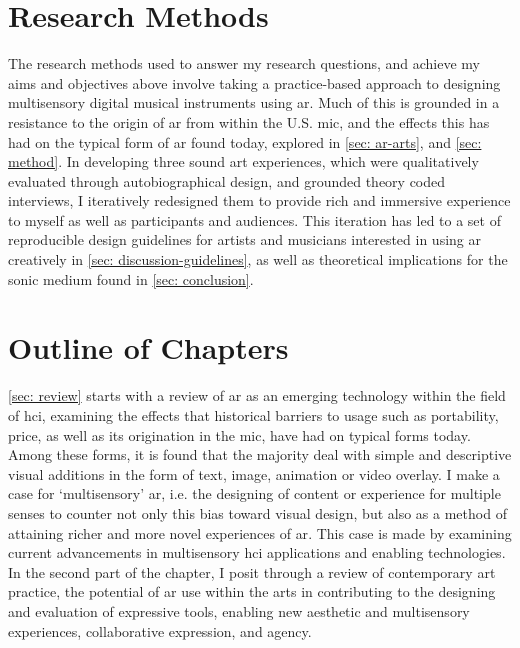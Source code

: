 \section{Research Methods}\label{sec: introduction-methods}
The research methods used to answer my research questions, and achieve my aims and objectives above involve taking a practice-based approach to designing multisensory digital musical instruments using \gls{ar}. Much of this is grounded in a resistance to the origin of \gls{ar} from within the U.S. \gls{mic}, and the effects this has had on the typical form of \gls{ar} found today, explored in \autoref{sec: ar-arts}, and \autoref{sec: method}. In developing three sound \gls{art} experiences, which were qualitatively evaluated through autobiographical design, and grounded theory coded interviews, I iteratively redesigned them to provide rich and immersive experience to myself as well as participants and audiences. This iteration has led to a set of reproducible design guidelines for artists and musicians interested in using \gls{ar} creatively in \autoref{sec: discussion-guidelines}, as well as theoretical implications for the sonic medium found in \autoref{sec: conclusion}.




\section{Outline of Chapters}\label{sec: introduction-outline}
\autoref{sec: review} starts with a review of \gls{ar} as an emerging technology within the field of \gls{hci}, examining the effects that historical barriers to usage such as portability, price, as well as its origination in the \gls{mic}, have had on typical forms today. Among these forms, it is found that the majority deal with simple and descriptive visual additions in the form of text, image, animation or video overlay. I make a case for `multisensory' \gls{ar}, i.e. the designing of content or experience for multiple senses to counter not only this bias toward visual design, but also as a method of attaining richer and more novel experiences of \gls{ar}. This case is made by examining current advancements in multisensory \gls{hci} applications and enabling technologies. In the second part of the chapter, I posit through a review of contemporary art practice, the potential of \gls{ar} use within the arts in contributing to the designing and evaluation of expressive tools, enabling new aesthetic and multisensory experiences, collaborative expression, and agency.

